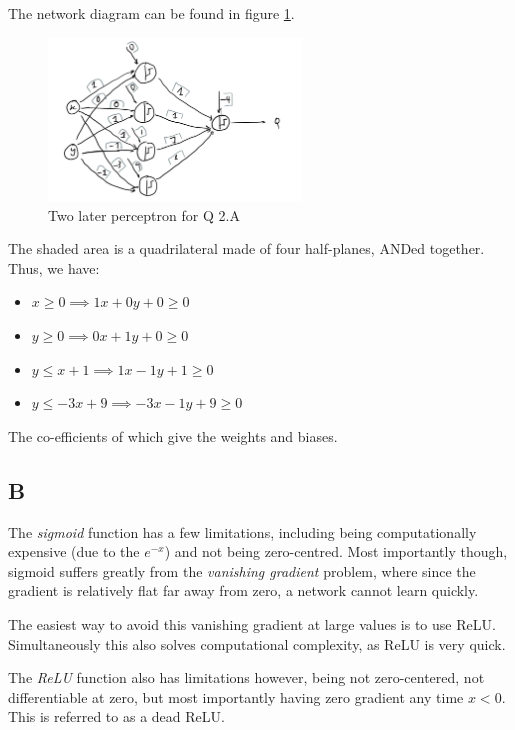 \documentclass{article}
\begin{document}
The network diagram can be found in figure \ref{fig:2l}.

\begin{figure}[t]
   \includegraphics[width=0.6\textwidth]{2layerperc.png}
   \centering
   \caption[]{Two later perceptron for Q 2.A}
   \label{fig:2l}
\end{figure}

The shaded area is a quadrilateral made of four half-planes, ANDed together. Thus, we have:

\begin{itemize}
   \item $x \geq 0 \implies 1x + 0y + 0 \geq 0$
   \item $y \geq 0 \implies 0x + 1y + 0 \geq 0$
   \item $y \leq x + 1 \implies 1x - 1y + 1 \geq 0$
   \item $y \leq -3x + 9 \implies -3x -1y + 9 \geq 0$
\end{itemize}

The co-efficients of which give the weights and biases.

\subsection*{B}

The \textit{sigmoid} function has a few limitations, including being computationally expensive (due to the $e^{-x}$) and not being zero-centred. Most importantly though, sigmoid suffers greatly from the \textit{vanishing gradient} problem, where since the gradient is relatively flat far away from zero, a network cannot learn quickly. 

The easiest way to avoid this vanishing gradient at large values is to use ReLU. Simultaneously this also solves computational complexity, as ReLU is very quick.

The \textit{ReLU} function also has limitations however, being not zero-centered, not differentiable at zero, but most importantly having zero gradient any time $x < 0$. This is referred to as a dead ReLU.
\end{document}

